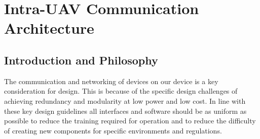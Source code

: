 \newpage
{}
\section{Intra-UAV Communication Architecture} \label{Intra Communication}

\subsection{Introduction and Philosophy}
The communication and networking of devices on our device is a key consideration for design. This is because of the specific design challenges of achieving redundancy and modularity at low power and low cost. In line with these key design guidelines all interfaces and software should be as uniform as possible to reduce the training required for operation and to reduce the difficulty of creating new components for specific environments and regulations.



